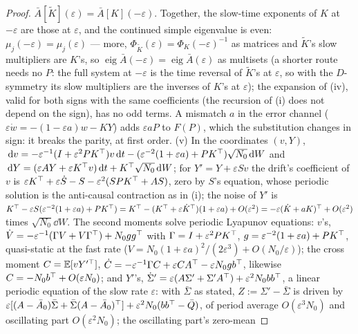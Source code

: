 \begin{proof}
$\bar A[\tilde K](\varepsilon) = \bar A[K](-\varepsilon)$. Together, the slow-time exponents of $K$ at
$-\varepsilon$ are those at $\varepsilon$, and the continued simple eigenvalue is even:
$\mu_j(-\varepsilon) = \mu_j(\varepsilon)$ --- more, $\Phi_{\tilde K}(\varepsilon) = \Phi_K(-\varepsilon)^{-1}$ as
matrices and $\tilde K$'s slow multipliers are $K$'s, so
$\operatorname{eig}\bar A(-\varepsilon) = \operatorname{eig}\bar A(\varepsilon)$ as multisets (a shorter route needs
no $P$: the full system at $-\varepsilon$ is the time reversal of $\tilde K$'s at $\varepsilon$, so with the
$D$-symmetry its slow multipliers are the inverses of $K$'s at $\varepsilon$); the expansion of (iv), valid for both
signs with the same coefficients (the recursion of (i) does not depend on the sign), has no odd terms. A mismatch $a$
in the error channel ($\varepsilon\dot w = -(1 - \varepsilon a)w - KY$) adds $\varepsilon aP$ to $F(P)$, which the
substitution changes in sign: it breaks the parity, at first order. (v) In the coordinates $(v,Y)$,
$\,\mathrm{d} v = -\varepsilon^{-1}(I + \varepsilon^2PK^\top)v\,\mathrm{d} t - (\varepsilon^{-2}(1 + \varepsilon a) + PK^\top)\sqrt{N_0}\,\mathrm{d} W$
and $\,\mathrm{d} Y = (\varepsilon AY + \varepsilon K^\top v)\,\mathrm{d} t + K^\top\sqrt{N_0}\,\mathrm{d} W$; for $Y' = Y + \varepsilon Sv$ the
drift's coefficient of $v$ is $\varepsilon K^\top + \varepsilon\dot S - S - \varepsilon^2(SPK^\top + AS)$, zero by $S$'s
equation, whose periodic solution is the anti-causal contraction as in (i); the noise of $Y'$ is
$K^\top - \varepsilon S(\varepsilon^{-2}(1 + \varepsilon a) + PK^\top)
= K^\top - (K^\top + \varepsilon\dot K^\top)(1 + \varepsilon a) + O(\varepsilon^2)
= -\varepsilon(\dot K + aK)^\top + O(\varepsilon^2)$ times $\sqrt{N_0}\dd W$. The second moments solve periodic
Lyapunov equations: $v$'s, $\dot V = -\varepsilon^{-1}(\Gamma V + V\Gamma^\top) + N_0gg^\top$ with
$\Gamma = I + \varepsilon^2PK^\top$, $g = \varepsilon^{-2}(1 + \varepsilon a) + PK^\top$, quasi-static at the fast rate
($V = N_0(1 + \varepsilon a)^2/(2\varepsilon^3) + O(N_0/\varepsilon)$); the cross moment $C = \mathbb{E}[vY'^\top]$,
$\dot C = -\varepsilon^{-1}\Gamma C + \varepsilon CA^\top - \varepsilon N_0gb^\top$, likewise
$C = -N_0b^\top + O(\varepsilon N_0)$; and $Y'$'s,
$\dot\Sigma' = \varepsilon(A\Sigma' + \Sigma'A^\top) + \varepsilon^2N_0bb^\top$, a linear periodic equation of the slow
rate $\varepsilon$: with $\bar\Sigma$ as stated, $Z := \Sigma' - \bar\Sigma$ is driven by
$\varepsilon[(A - \bar A_0)\bar\Sigma + \bar\Sigma(A - \bar A_0)^\top] + \varepsilon^2N_0(bb^\top - \bar Q)$, of period
average $O(\varepsilon^3N_0)$ and oscillating part $O(\varepsilon^2N_0)$; the oscillating part's zero-mean

\end{proof}
